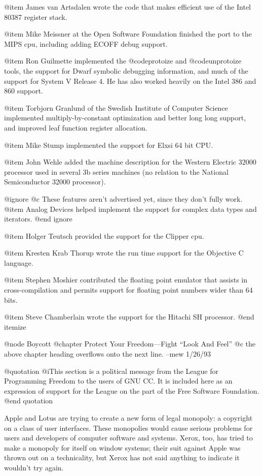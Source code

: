 @item
James van Artsdalen wrote the code that makes efficient use of
the Intel 80387 register stack.

@item
Mike Meissner at the Open Software Foundation finished the port to the
MIPS cpu, including adding ECOFF debug support.

@item
Ron Guilmette implemented the @code{protoize} and @code{unprotoize}
tools, the support for Dwarf symbolic debugging information, and much of
the support for System V Release 4.  He has also worked heavily on the
Intel 386 and 860 support.

@item
Torbjorn Granlund of the Swedish Institute of Computer Science
implemented multiply-by-constant optimization and better long long
support, and improved leaf function register allocation.

@item
Mike Stump implemented the support for Elxsi 64 bit CPU.

@item
John Wehle added the machine description for the Western Electric 32000
processor used in several 3b series machines (no relation to the
National Semiconductor 32000 processor).

@ignore @c These features aren't advertised yet, since they don't fully work.
@item
Analog Devices helped implement the support for complex data types
and iterators.
@end ignore

@item
Holger Teutsch provided the support for the Clipper cpu.

@item
Kresten Krab Thorup wrote the run time support for the Objective C
language.

@item
Stephen Moshier contributed the floating point emulator that assists in
cross-compilation and permits support for floating point numbers wider
than 64 bits.

@item
Steve Chamberlain wrote the support for the Hitachi SH processor.
@end itemize

@node Boycott
@chapter Protect Your Freedom---Fight ``Look And Feel''
@c the above chapter heading overflows onto the next line. --mew 1/26/93 

@quotation
@i{This section is a political message from the League for Programming
Freedom to the users of GNU CC.  It is included here as an expression
of support for the League on the part of the Free Software Foundation.}
@end quotation

Apple and Lotus are trying to create a new form of legal monopoly: a
copyright on a class of user interfaces.  These monopolies would cause
serious problems for users and developers of computer software and
systems.  Xerox, too, has tried to make a monopoly for itself on window
systems; their suit against Apple was thrown out on a technicality, but
Xerox has not said anything to indicate it wouldn't try again.

